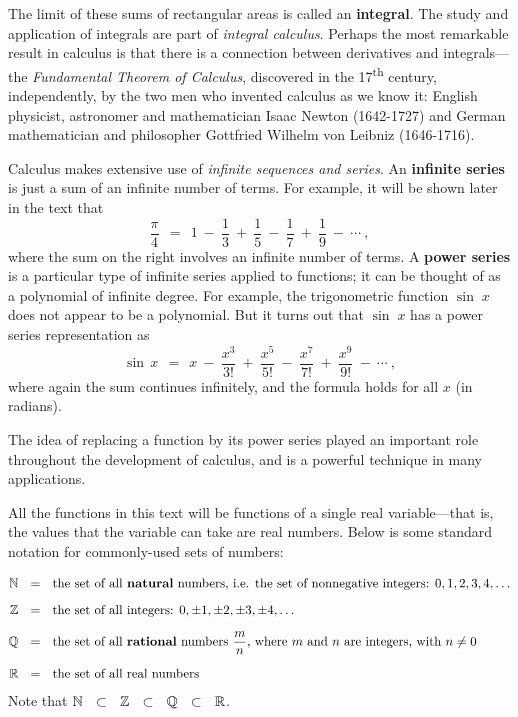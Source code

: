 The limit of these sums of rectangular areas is called an \textbf{integral}.
The study and application of integrals are part of
\emph{integral calculus}. Perhaps the most remarkable result in
calculus is that there is a connection between derivatives and integrals---the
\emph{Fundamental Theorem of Calculus}, discovered
in the 17\textsuperscript{th} century, independently, by the two men who
invented calculus as we know it: English physicist, astronomer and
mathematician Isaac Newton (1642-1727) and German mathematician and philosopher
Gottfried Wilhelm von Leibniz (1646-1716).

Calculus makes extensive use of \emph{infinite sequences and
series}. An
\textbf{infinite series} is just a sum of an infinite number of terms. For
example, it will be shown later in the text that
\begin{equation}\label{eqn:piseries}
 \frac{\pi}{4} ~~=~~ 1 ~-~ \frac{1}{3} ~+~ \frac{1}{5} ~-~ \frac{1}{7} ~+~
 \frac{1}{9} ~-~ \cdots ~,
\end{equation}
where the sum on the right involves an infinite number of terms. A \textbf{power
series} is a particular type of infinite series applied to
functions; it can be thought of as a polynomial of infinite degree. For example,
the trigonometric function $\sin\;x$ does not appear to be a polynomial. But it
turns out that $\sin\;x$ has a power series representation as
\begin{equation}\label{eqn:sinseries}
 \sin\,x ~~=~~ x ~-~ \frac{x^3}{3!} ~+~ \frac{x^5}{5!} ~-~ \frac{x^7}{7!} ~+~
 \frac{x^9}{9!} ~-~ \cdots ~,
\end{equation}
where again the sum continues infinitely, and the formula holds for all $x$ (in
radians).

The idea of replacing a function by its power series played an important role
throughout the development of calculus, and is a powerful technique in many
applications.

All the functions in this text will be functions of a single real
variable---that is, the values that the variable can take are real
numbers. Below is some standard notation for commonly-used sets
of numbers:

\begin{align*}
 \mathbb{N} ~~&=~~ \text{the set of all \textbf{natural} numbers, i.e. the set of
  nonnegative integers: } 0, 1, 2, 3, 4, \ldots\\[6pt]
 \mathbb{Z} ~~&=~~ \text{the set of all integers: } 0, \pm 1, \pm 2, \pm 3,
  \pm 4, \ldots\\[6pt]
 \mathbb{Q} ~~&=~~ \text{the set of all \textbf{rational} numbers $\frac{m}{n}$,
  where $m$ and $n$ are integers, with $n \ne 0$}\\[6pt]
 \mathbb{R} ~~&=~~ \text{the set of all real numbers}
\end{align*}
Note that $\mathbb{N} ~~\subset~~ \mathbb{Z} ~~\subset~~ \mathbb{Q} ~~\subset~~
\mathbb{R}$.

